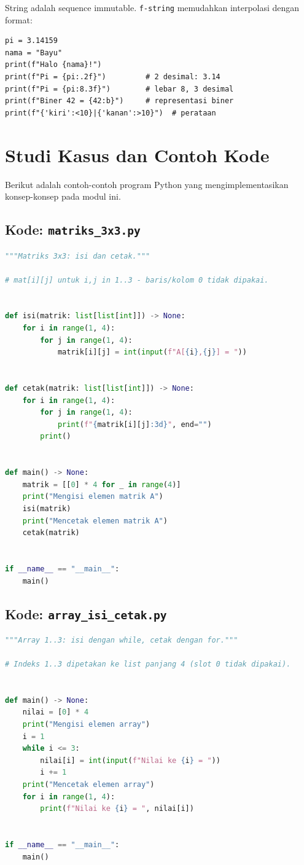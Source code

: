 \documentclass[../main.tex]{subfiles}
\begin{document}
String adalah sequence immutable. \texttt{f-string} memudahkan interpolasi dengan format:

\begin{lstlisting}[caption=f-string dengan format specification]
pi = 3.14159
nama = "Bayu"
print(f"Halo {nama}!")
print(f"Pi = {pi:.2f}")         # 2 desimal: 3.14
print(f"Pi = {pi:8.3f}")        # lebar 8, 3 desimal
print(f"Biner 42 = {42:b}")     # representasi biner
print(f"{'kiri':<10}|{'kanan':>10}")  # perataan
\end{lstlisting}

\section{Studi Kasus dan Contoh Kode}

Berikut adalah contoh-contoh program Python yang mengimplementasikan konsep-konsep pada modul ini.

\subsection{Kode: \texttt{matriks\_3x3.py}}
\begin{lstlisting}[language=Python,caption={\texttt{matriks\_3x3.py}}]
"""Matriks 3x3: isi dan cetak."""

# mat[i][j] untuk i,j in 1..3 - baris/kolom 0 tidak dipakai.


def isi(matrik: list[list[int]]) -> None:
    for i in range(1, 4):
        for j in range(1, 4):
            matrik[i][j] = int(input(f"A[{i},{j}] = "))


def cetak(matrik: list[list[int]]) -> None:
    for i in range(1, 4):
        for j in range(1, 4):
            print(f"{matrik[i][j]:3d}", end="")
        print()


def main() -> None:
    matrik = [[0] * 4 for _ in range(4)]
    print("Mengisi elemen matrik A")
    isi(matrik)
    print("Mencetak elemen matrik A")
    cetak(matrik)


if __name__ == "__main__":
    main()
\end{lstlisting}

\subsection{Kode: \texttt{array\_isi\_cetak.py}}
\begin{lstlisting}[language=Python,caption={\texttt{array\_isi\_cetak.py}}]
"""Array 1..3: isi dengan while, cetak dengan for."""

# Indeks 1..3 dipetakan ke list panjang 4 (slot 0 tidak dipakai).


def main() -> None:
    nilai = [0] * 4
    print("Mengisi elemen array")
    i = 1
    while i <= 3:
        nilai[i] = int(input(f"Nilai ke {i} = "))
        i += 1
    print("Mencetak elemen array")
    for i in range(1, 4):
        print(f"Nilai ke {i} = ", nilai[i])


if __name__ == "__main__":
    main()
\end{lstlisting}
\end{document}

